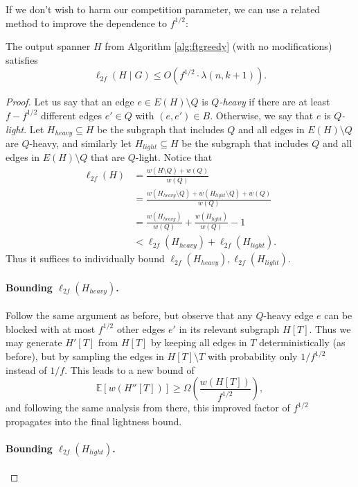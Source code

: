 If we don't wish to harm our competition parameter, we can use a related method to improve the dependence to $f^{1/2}$:
\begin{theorem} \label{thm:warmupgoodf}
The output spanner $H$ from Algorithm \ref{alg:ftgreedy} (with no modifications) satisfies
$$\ell_{2f}(H \mid G) \le O\left( f^{1/2} \cdot \lambda(n, k+1) \right).$$
\end{theorem}
\begin{proof}
Let us say that an edge $e \in E(H) \setminus Q$ is \emph{$Q$-heavy} if there are at least $f - f^{1/2}$ different edges $e' \in Q$ with $(e, e') \in B$.
Otherwise, we say that $e$ is \emph{$Q$-light}.
Let $H_{heavy} \subseteq H$ be the subgraph that includes $Q$ and all edges in $E(H) \setminus Q$ are $Q$-heavy, and similarly let $H_{light} \subseteq H$ be the subgraph that includes $Q$ and all edges in $E(H) \setminus Q$ that are $Q$-light.
Notice that
\begin{align*}
\ell_{2f}(H) &= \frac{w(H \setminus Q) + w(Q)}{w(Q)} \\
&= \frac{w(H_{heavy} \setminus Q) + w(H_{light} \setminus Q) + w(Q)}{w(Q)} \\
&= \frac{w(H_{heavy})}{w(Q)} + \frac{w(H_{light})}{w(Q)} - 1\\
&< \ell_{2f}(H_{heavy}) + \ell_{2f}(H_{light}).
\end{align*}
Thus it suffices to individually bound $\ell_{2f}(H_{heavy}), \ell_{2f}(H_{light})$.

\paragraph{Bounding $\ell_{2f}(H_{heavy})$.}

Follow the same argument as before, but observe that any $Q$-heavy edge $e$ can be blocked with at most $f^{1/2}$ other edges $e'$ in its relevant subgraph $H[T]$.
Thus we may generate $H'[T]$ from $H[T]$ by keeping all edges in $T$ deterministically (as before), but by sampling the edges in $H[T] \setminus T$ with probability only $1/f^{1/2}$ instead of $1/f$.
This leads to a new bound of
$$\mathbb{E}\left[w(H''[T])\right] \ge \Omega\left( \frac{w(H[T])}{f^{1/2}} \right),$$
and following the same analysis from there, this improved factor of $f^{1/2}$ propagates into the final lightness bound.

\paragraph{Bounding $\ell_{2f}(H_{light})$.}


\end{proof}
